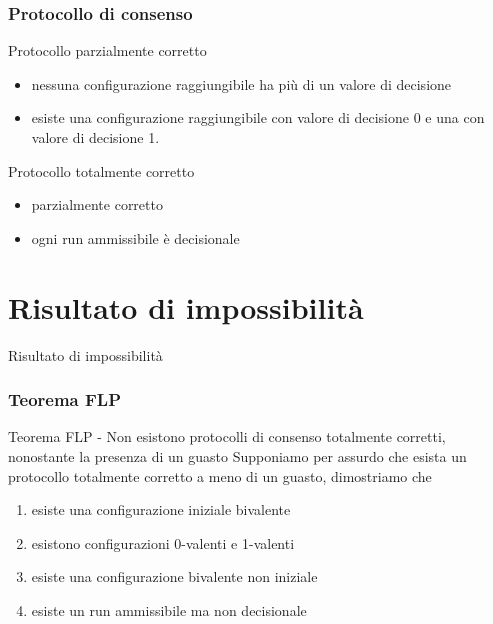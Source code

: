 \documentclass{beamer}
\begin{document}
\begin{frame}\frametitle{Protocollo di consenso}
\begin{block}{Protocollo parzialmente corretto}
\begin{itemize}
\item nessuna configurazione raggiungibile ha più di un valore di decisione
\item esiste una configurazione raggiungibile con valore di decisione 0 e una con valore di decisione 1.
\end{itemize}
\end{block}
\pause
\begin{block}{Protocollo totalmente corretto}
\begin{itemize}
\item parzialmente corretto
\item ogni run ammissibile è decisionale
\end{itemize}
\end{block}
\end{frame}

\section{Risultato di impossibilità}
\begin{frame}{}\begin{block}{}\centering\LARGE Risultato di impossibilità\end{block}\vspace{0.5cm}\end{frame}


\begin{frame}\frametitle{Teorema FLP}
\begin{block}{Teorema FLP - Non esistono protocolli di consenso totalmente corretti, nonostante la presenza di un guasto}
Supponiamo per assurdo che esista un protocollo totalmente corretto a meno di un guasto, dimostriamo che
\begin{enumerate}
\item esiste una configurazione iniziale bivalente
\item esistono configurazioni 0-valenti e 1-valenti 
\item esiste una configurazione bivalente non iniziale
\item esiste un run ammissibile ma non decisionale
\end{enumerate}
\end{block}
\end{frame}
\end{document}
